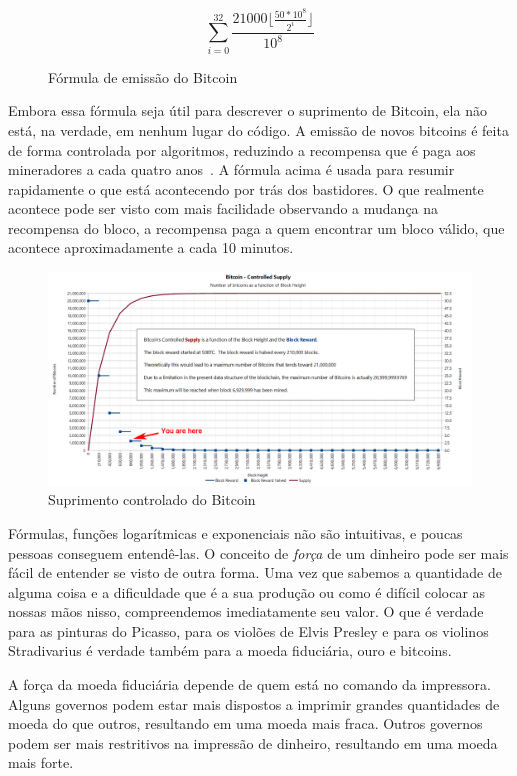 \begin{figure}
  \centering
  \begin{equation}
  \sum\limits_{i=0}^{32} \frac{21000 \lfloor \frac{50*10^8}{2^i} \rfloor}{10^8}
  \end{equation}
  \caption{Fórmula de emissão do Bitcoin}
  \label{fig:supply-formula-white}
\end{figure}

Embora essa fórmula seja útil para descrever o suprimento de Bitcoin, ela não está, na verdade, em nenhum lugar do código. A emissão de novos bitcoins é feita de forma controlada por algoritmos, reduzindo a recompensa que é paga aos mineradores a cada quatro anos~\cite {btcwiki:supply}. A fórmula acima é usada para resumir rapidamente o que está acontecendo por trás dos bastidores. O que realmente acontece pode ser visto com mais facilidade observando a mudança na recompensa do bloco, a recompensa paga a quem encontrar um bloco válido, que acontece aproximadamente a cada 10 minutos.

\begin{figure}
  \includegraphics{assets/images/you-are-here.png}
  \caption{Suprimento controlado do Bitcoin}
  \label{fig:you-are-here.png}
\end{figure}

Fórmulas, funções logarítmicas e exponenciais não são intuitivas, e poucas pessoas conseguem entendê-las. O conceito de \textit{força} de um dinheiro pode ser mais fácil de entender se visto de outra forma. Uma vez que sabemos a quantidade de alguma coisa e a dificuldade que é a sua produção ou como é difícil colocar as nossas mãos nisso, compreendemos imediatamente seu valor. O que é verdade para as pinturas do Picasso, para os violões de Elvis Presley e para os violinos Stradivarius é verdade também para a moeda fiduciária, ouro e bitcoins.

A força da moeda fiduciária depende de quem está no comando da impressora. Alguns governos podem estar mais dispostos a imprimir grandes quantidades de moeda do que outros, resultando em uma moeda mais fraca. Outros governos podem ser mais restritivos na impressão de dinheiro, resultando em uma moeda mais forte.

